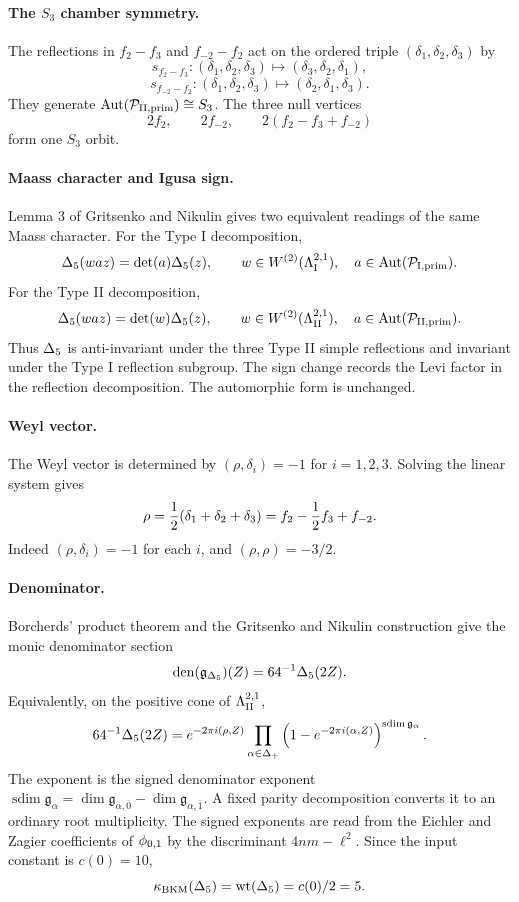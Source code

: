 \paragraph{The $S_3$ chamber symmetry.}
The reflections in $f_2-f_3$ and $f_{-2}-f_2$ act on the ordered triple
$(\delta_1,\delta_2,\delta_3)$ by
\[
  s_{f_2-f_3}:(\delta_1,\delta_2,\delta_3)
  \mapsto(\delta_3,\delta_2,\delta_1),
\]
\[
  s_{f_{-2}-f_2}:(\delta_1,\delta_2,\delta_3)
  \mapsto(\delta_2,\delta_1,\delta_3).
\]
They generate $\operatorname{Aut}(\mathcal{P}_{\mathrm{II,prim}})\cong S_3$.
The three null vertices
\[
  2f_2,\qquad 2f_{-2},\qquad 2(f_2-f_3+f_{-2})
\]
form one $S_3$ orbit.

\paragraph{Maass character and Igusa sign.}
Lemma 3 of Gritsenko and Nikulin gives two equivalent readings of the
same Maass character. For the Type I decomposition,
\[
  \Delta_{5}(waz)=\det(a)\Delta_{5}(z),
  \qquad
  w\in W^{(2)}(\Lambda^{2,1}_{\mathrm{I}}),\quad
  a\in\operatorname{Aut}(\mathcal{P}_{\mathrm{I,prim}}).
\]
For the Type II decomposition,
\[
  \Delta_{5}(waz)=\det(w)\Delta_{5}(z),
  \qquad
  w\in W^{(2)}(\Lambda^{2,1}_{\mathrm{II}}),\quad
  a\in\operatorname{Aut}(\mathcal{P}_{\mathrm{II,prim}}).
\]
Thus $\Delta_{5}$ is anti-invariant under the three Type II simple
reflections and invariant under the Type I reflection subgroup. The
sign change records the Levi factor in the reflection decomposition.
The automorphic form is unchanged.

\paragraph{Weyl vector.}
The Weyl vector is determined by
$(\rho,\delta_i)=-1$ for $i=1,2,3$. Solving the linear system gives
\[
  \rho
  =
  {1\over2}(\delta_1+\delta_2+\delta_3)
  =
  f_2-\frac12 f_3+f_{-2}.
\]
Indeed $(\rho,\delta_i)=-1$ for each $i$, and
$(\rho,\rho)=-3/2$.

\paragraph{Denominator.}
Borcherds' product theorem and the Gritsenko and Nikulin construction give
the monic denominator section
\[
  \operatorname{den}(\mathfrak g_{\Delta_{5}})(Z)
  =
  64^{-1}\Delta_{5}(2Z).
\]
Equivalently, on the positive cone of $\Lambda^{2,1}_{\mathrm{II}}$,
\[
  64^{-1}\Delta_{5}(2Z)
  =
  e^{-2\pi i(\rho,Z)}
  \prod_{\alpha\in\Delta_+}
  \left(1-e^{-2\pi i(\alpha,Z)}\right)^{
    \operatorname{sdim}\mathfrak g_{\alpha}}.
\]
The exponent is the signed denominator exponent
$\operatorname{sdim}\mathfrak g_{\alpha}=
  \dim\mathfrak g_{\alpha,\bar0}-\dim\mathfrak g_{\alpha,\bar1}$.
A fixed parity decomposition converts it to an ordinary root
multiplicity. The signed exponents are read from the
Eichler and Zagier coefficients of $\phi_{0,1}$ by the discriminant
$4nm-\ell^2$. Since the input constant is $c(0)=10$,
\[
  \kappa_{\mathrm{BKM}}(\Delta_{5})=\operatorname{wt}(\Delta_{5})=c(0)/2=5 .
\]

